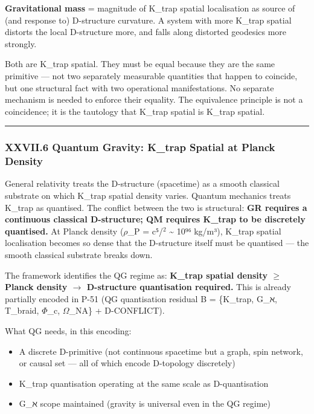 \documentclass[12pt,a4paper]{article}
\begin{document}
\textbf{Gravitational mass} = magnitude of K\_trap spatial localisation as source of (and response to) D-structure curvature. A system with more K\_trap spatial distorts the local D-structure more, and falls along distorted geodesics more strongly.

Both are K\_trap spatial. They must be equal because they are the same primitive --- not two separately measurable quantities that happen to coincide, but one structural fact with two operational manifestations. No separate mechanism is needed to enforce their equality. The equivalence principle is not a coincidence; it is the tautology that K\_trap spatial is K\_trap spatial.

\begin{center}
\rule{0.5\textwidth}{0.4pt}
\end{center}

\subsubsection{XXVII.6 Quantum Gravity: K\_trap Spatial at Planck Density}

General relativity treats the D-structure (spacetime) as a smooth classical substrate on which K\_trap spatial density varies. Quantum mechanics treats K\_trap as quantised. The conflict between the two is structural: \textbf{GR requires a continuous classical D-structure; QM requires K\_trap to be discretely quantised.} At Planck density ($\rho$\_P = c⁵/\hbarG$^{2}$ \textasciitilde{} 10⁹⁶ kg/m³), K\_trap spatial localisation becomes so dense that the D-structure itself must be quantised --- the smooth classical substrate breaks down.

The framework identifies the QG regime as: \textbf{K\_trap spatial density $\geq$ Planck density $\rightarrow$ D-structure quantisation required.} This is already partially encoded in P-51 (QG quantisation residual B = \{K\_trap, G\_ℵ, T\_braid, $\Phi$\_c, $\Omega$\_NA\} + D-CONFLICT).

What QG needs, in this encoding:

\begin{itemize}
    \item A discrete D-primitive (not continuous spacetime but a graph, spin network, or causal set --- all of which encode D-topology discretely)
    \item K\_trap quantisation operating at the same scale as D-quantisation
    \item G\_ℵ scope maintained (gravity is universal even in the QG regime)
\end{itemize}
\end{document}
